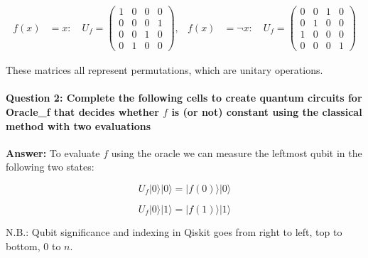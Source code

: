 \documentclass[11pt]{article}
\begin{document}
\[
\begin{aligned}
f(x)&=x: \quad
U_f = \begin{pmatrix}
1 & 0 & 0 & 0 \\
0 & 0 & 0 & 1 \\
0 & 0 & 1 & 0 \\
0 & 1 & 0 & 0
\end{pmatrix},
&
f(x)&=\neg x:\quad
U_f = \begin{pmatrix}
0 & 0 & 1 & 0 \\
0 & 1 & 0 & 0 \\
1 & 0 & 0 & 0 \\
0 & 0 & 0 & 1
\end{pmatrix}
\end{aligned}
\]

These matrices all represent permutations, which are unitary operations.

    \paragraph{\texorpdfstring{ \textbf{Question 2}: Complete the following
cells to create quantum circuits for Oracle\_f that decides whether
\(f\) is (or not) constant using the classical method with two
evaluations
}{ Question 2: Complete the following cells to create quantum circuits for Oracle\_f that decides whether f is (or not) constant using the classical method with two evaluations }}\label{question-2-complete-the-following-cells-to-create-quantum-circuits-for-oracle_f-that-decides-whether-f-is-or-not-constant-using-the-classical-method-with-two-evaluations}

\textbf{Answer:} To evaluate \(f\) using the oracle we can measure the
leftmost qubit in the following two states:

\[
U_f|0\rangle|0\rangle = |f(0)\rangle|0\rangle
\]

\[
U_f|0\rangle|1\rangle = |f(1)\rangle|1\rangle
\]

N.B.: Qubit significance and indexing in Qiskit goes from right to left,
top to bottom, \(0\) to \(n\).
\end{document}

